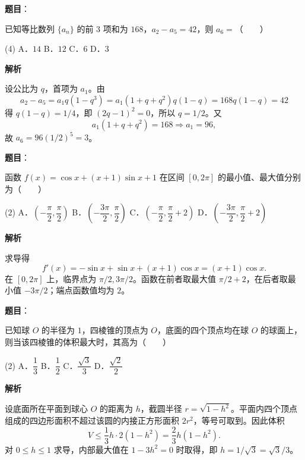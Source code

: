\begin{answer}

\textbf{题目}：

已知等比数列 $\{a_n\}$ 的前 $3$ 项和为 $168$，$a_2-a_5=42$，则 $a_6=$\mbox{（　　）}

\begin{gkopts}(4)
\task A．$14$
\task B．$12$
\task C．$6$
\task D．$3$
\end{gkopts}

\textbf{解析}

设公比为 $q$，首项为 $a_1$。由
\nopagebreak[4]
\[
a_2-a_5=a_1q(1-q^3)=a_1(1+q+q^2)q(1-q)=168q(1-q)=42
\]
得 $q(1-q)=1/4$，即 $(2q-1)^2=0$，所以 $q=1/2$。又
\nopagebreak[4]
\[
a_1(1+q+q^2)=168\Longrightarrow a_1=96,
\]
故 $a_6=96(1/2)^5=3$。


\end{answer}
\begin{answer}

\textbf{题目}：

函数 $f(x)=\cos x+(x+1)\sin x+1$ 在区间 $[0,2\pi]$ 的最小值、最大值分别为\mbox{（　　）}

\begin{gkopts}(2)
\task A．$\left(-\dfrac\pi2,\dfrac\pi2\right)$
\task B．$\left(-\dfrac{3\pi}2,\dfrac\pi2\right)$
\task C．$\left(-\dfrac\pi2,\dfrac\pi2+2\right)$
\task D．$\left(-\dfrac{3\pi}2,\dfrac\pi2+2\right)$
\end{gkopts}

\textbf{解析}

求导得
\nopagebreak[4]
\[
f'(x)=-\sin x+\sin x+(x+1)\cos x=(x+1)\cos x.
\]
在 $[0,2\pi]$ 上，临界点为 $\pi/2,3\pi/2$。函数在前者取最大值 $\pi/2+2$，在后者取最小值 $-3\pi/2$；端点函数值均为 $2$。


\end{answer}
\begin{answer}

\textbf{题目}：

已知球 $O$ 的半径为 $1$，四棱锥的顶点为 $O$，底面的四个顶点均在球 $O$ 的球面上，则当该四棱锥的体积最大时，其高为\mbox{（　　）}

\begin{gkopts}(2)
\task A．$\dfrac13$
\task B．$\dfrac12$
\task C．$\dfrac{\sqrt3}{3}$
\task D．$\dfrac{\sqrt2}{2}$
\end{gkopts}

\textbf{解析}

设底面所在平面到球心 $O$ 的距离为 $h$，截圆半径 $r=\sqrt{1-h^2}$。平面内四个顶点组成的四边形面积不超过该圆的内接正方形面积 $2r^2$，等号可取到。因此体积
\nopagebreak[4]
\[
V\le\frac13h\cdot2(1-h^2)=\frac23h(1-h^2).
\]
对 $0\le h\le1$ 求导，内部最大值在 $1-3h^2=0$ 时取得，即 $h=1/\sqrt3=\sqrt3/3$。


\end{answer}
